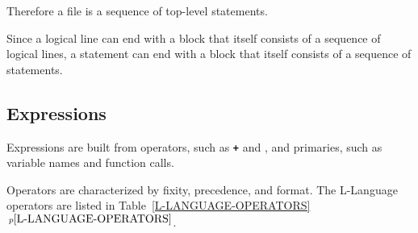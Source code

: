 \documentclass[12pt]{article}
\newcommand{\TT}[1]{{\tt \bfseries #1}}
\newcommand{\itemref}[1]{\ref{#1}$\,^{p\pageref{#1}}$}
\begin{document}
Therefore a file is a sequence of top-level statements.

Since a logical line can end with a block that itself consists
of a sequence of logical lines, a statement can end with
a block that itself consists of a sequence of statements.


\subsection{Expressions}

Expressions are built from operators, such as \TT{+} and \TT{*},
and primaries, such as variable names and function calls.

Operators are characterized by fixity, precedence, and format.
The L-Language operators are listed in Table~\itemref{L-LANGUAGE-OPERATORS}.
\end{document}
